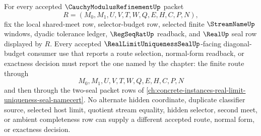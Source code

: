 \begin{corollary}
\label{cor:cauchy-modulus-refinement-diagonal-budget-cofinality-determinacy}
For every accepted $\CauchyModulusRefinementUp$ packet
$$
R=(M_0,M_1,U,V,T,W,Q,E,H,C,P,N),
$$
fix the local shared-meet row, selector-budget row, selected finite $\StreamNameUp$ windows, dyadic tolerance ledger, $\RegSeqRatUp$ readback, and $\RealUp$ seal row displayed by $R$. Every accepted $\RealLimitUniquenessSealUp$-facing diagonal-budget consumer use that reports a route selection, normal-form readback, or exactness decision must report the one named by the chapter: the finite route through
$$
M_0,M_1,U,V,T,W,Q,E,H,C,P,N
$$
and then through the two-seal packet rows of \autoref{ch:concrete-instances-real-limit-uniqueness-seal-namecert}. No alternate hidden coordinate, duplicate classifier source, selected host limit, quotient stream equality, hidden selector, second meet, or ambient completeness row can supply a different accepted route, normal form, or exactness decision.
\end{corollary}
